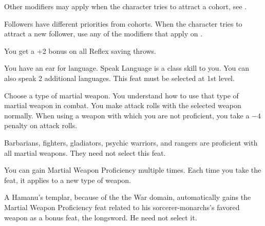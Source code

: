 {

Other modifiers may apply when the character tries to attract a cohort, see .


Followers have different priorities from cohorts. When the character tries to attract a new follower, use any of the modifiers that apply on .

}

{You get a +2 bonus on all Reflex saving throws.}

{You have an ear for language.}{}
{Speak Language is a class skill to you. You can also speak 2 additional languages.}{}
{This feat must be selected at 1st level.}

{Choose a type of martial weapon. You understand how to use that type of martial weapon in combat.}
{}
{You make attack rolls with the selected weapon normally.}
{When using a weapon with which you are not proficient, you take a $-4$ penalty on attack rolls.}
{Barbarians, fighters, gladiators, psychic warriors, and rangers are proficient with all martial weapons. They need not select this feat.

You can gain Martial Weapon Proficiency multiple times. Each time you take the feat, it applies to a new type of weapon.

A Hamanu's templar, because of the the War domain, automatically gains the Martial Weapon Proficiency feat related to his sorcerer-monarchs's favored weapon as a bonus feat, the longsword. He need not select it.}

